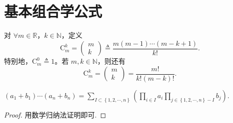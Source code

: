 \documentclass[../../main.tex]{subfiles}
\begin{document}
\section{基本组合学公式}

\begin{definition}
对 \( \forall m \in \mathbb{R} \)，\( k \in \mathbb{N} \)，定义
\[
\mathrm{C}_{m}^{k} = \begin{pmatrix} m \\ k \end{pmatrix} \triangleq \frac{m(m - 1) \cdots (m - k + 1)}{k!}.
\]
特别地，\( \mathrm{C}_{m}^{0} \triangleq 1 \)。若 \( m, k \in \mathbb{N} \)，则还有
\[
\mathrm{C}_{m}^{k} = \begin{pmatrix} m \\ k \end{pmatrix} = \frac{m!}{k! (m - k)!}.
\]
\end{definition}

\begin{theorem}[二项式定理的推广]\label{theorem:二项式定理的推广}
$\left( a_1+b_1 \right)\cdots \left( a_n+b_n \right) =\sum_{I\subset \left\{ 1,2,\cdots ,n \right\}}{\left( \prod_{i\in I}{a_i}\prod_{j\in \left\{ 1,2,\cdots ,n \right\} -I}{b_j} \right)}.$
\end{theorem}
\begin{proof}
用数学归纳法证明即可.
\end{proof}
\end{document}
